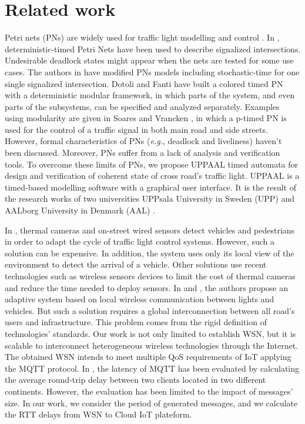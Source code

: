 \section{Related work} \label{Sec:Related_Works}

Petri nets (PNs) are widely used for traffic light modelling and control \cite{huang_modular_2014}.
In  \cite{difebbraro_trafficresponsive_2006},
	deterministic-timed Petri Nets have been used to describe signalized intersections.
Undesirable deadlock states might appear when the nets are tested for some use cases.
The authors in \cite{febbraro_using_2009} have modified PNs models including  stochastic-time for one single signalized intersection.
Dotoli and Fanti \cite{dotoli_urban_2004} have built a colored timed PN with a deterministic modular framework,
	in which parts of the system,
	and even parts of the subsystems,
	can be specified and analyzed separately.
Examples using modularity are given in Soares and Vrancken \cite{dossantossoares_modular_2012},
	in which a p-timed PN is used for the control of a traffic signal in both main road and side streets.
However,
	formal characteristics of PNs (\emph{e.g.},
	deadlock and liveliness) haven’t been discussed.
Moreover,
	PNs suffer from a lack of analysis and verification tools.
To overcome these limits of PNs,
	we propose UPPAAL timed automata for design and verification of coherent state of cross road's traffic light.
UPPAAL is a timed-based modelling software with a graphical user interface.
It is the result of the research works of two universities UPPsala University in Sweden (UPP) and AALborg University in Denmark (AAL) \cite{david_uppaal_2015}.

In \cite{Web0},
	thermal cameras and on-street wired sensors detect vehicles and pedestrians in order to adapt the cycle of traffic light control systems.
However,
	such a solution can be expensive.
In addition,
	the system uses only its local view of the environment to detect the arrival of a vehicle.
Other solutions use recent technologies such as wireless sensors devices to limit the cost of thermal cameras and reduce the time needed to deploy sensors.
In \cite{tlig_decentralized_2014} and \cite{rose_internet_2015},
	the authors propose an adaptive system based on local wireless communication between lights and vehicles.
But such a solution requires a global interconnection between all road's users and infrastructure.
This problem comes from the rigid definition of technologies' standards.
Our work is not only limited to establish WSN,
	but it is scalable to interconnect heterogeneous wireless technologies through the Internet.
The obtained WSN intends to meet multiple QoS requirements of IoT applying the MQTT protocol.
In \cite{Silva2018},
	the latency of MQTT has been evaluated by calculating the average round-trip delay between two clients located in two different continents.
However,
	the evaluation has been limited to the impact of messages' size.
In our work,
	we consider the period of generated messages,
	and we calculate the RTT delays from WSN to Cloud IoT plateform.


